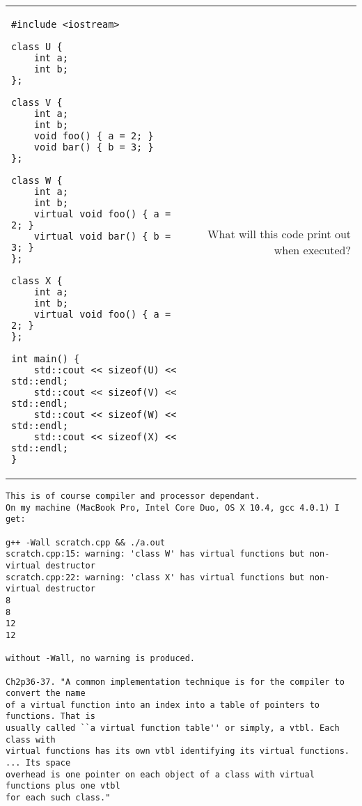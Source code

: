 \documentclass[landscape]{slides}
\begin{document}
\begin{slide}

\begin{tabular*}{\textwidth}{@{\extracolsep{\fill}}lr}

\begin{minipage}[c]{.6\linewidth}
\begin{lstlisting}
#include <iostream>

class U {
    int a;
    int b;
};

class V {
    int a;
    int b;
    void foo() { a = 2; }
    void bar() { b = 3; }
};

class W {
    int a;
    int b;
    virtual void foo() { a = 2; }
    virtual void bar() { b = 3; }
};

class X {
    int a;
    int b;
    virtual void foo() { a = 2; }
};

int main() {
    std::cout << sizeof(U) << std::endl;
    std::cout << sizeof(V) << std::endl;
    std::cout << sizeof(W) << std::endl;
    std::cout << sizeof(X) << std::endl;
}
\end{lstlisting}
\end{minipage}
&
\begin{minipage}{.3\linewidth}
What will this code print out when executed?
\end{minipage}
\end{tabular*}

\begin{note}
\begin{tiny}
\begin{verbatim}
This is of course compiler and processor dependant. 
On my machine (MacBook Pro, Intel Core Duo, OS X 10.4, gcc 4.0.1) I get:

g++ -Wall scratch.cpp && ./a.out
scratch.cpp:15: warning: 'class W' has virtual functions but non-virtual destructor
scratch.cpp:22: warning: 'class X' has virtual functions but non-virtual destructor
8
8
12
12

without -Wall, no warning is produced. 

Ch2p36-37. "A common implementation technique is for the compiler to convert the name
of a virtual function into an index into a table of pointers to functions. That is
usually called ``a virtual function table'' or simply, a vtbl. Each class with
virtual functions has its own vtbl identifying its virtual functions. ... Its space
overhead is one pointer on each object of a class with virtual functions plus one vtbl 
for each such class."
\end{verbatim}
\end{tiny}
\end{note}

\end{slide}
\end{document}
